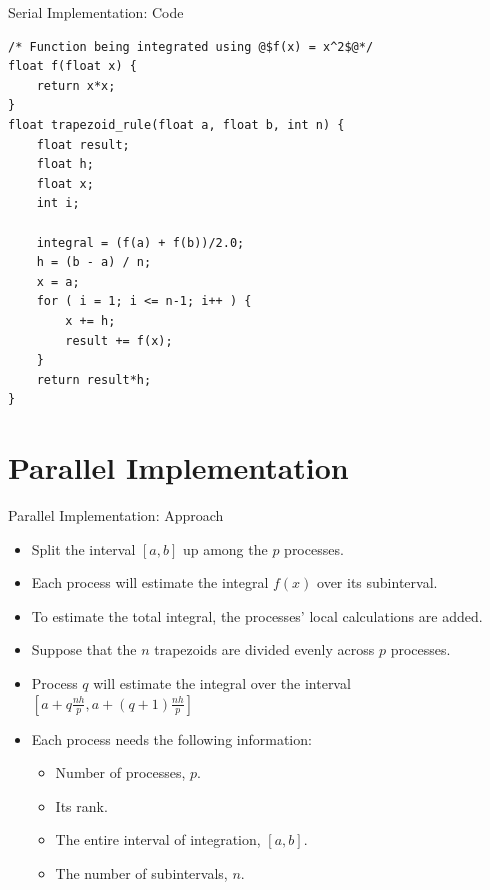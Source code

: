 \documentclass[t]{beamer}
\begin{document}
\begin{frame}[containsverbatim]{Serial Implementation: Code}
\begin{verbatim}
/* Function being integrated using @$f(x) = x^2$@*/
float f(float x) {
	return x*x;
}
float trapezoid_rule(float a, float b, int n) {
	float result;
	float h;
	float x;
	int i;

	integral = (f(a) + f(b))/2.0;
	h = (b - a) / n;
	x = a;
	for ( i = 1; i <= n-1; i++ ) {
		x += h;
		result += f(x);
	}
	return result*h;
}
\end{verbatim}
\end{frame}

\section{Parallel Implementation}
\begin{frame}{Parallel Implementation: Approach}
	\begin{itemize}
		\item Split the interval $[a,b]$ up among the $p$ processes.
		\item Each process will estimate the integral $f(x)$ over its subinterval.
		\item To estimate the total integral, the processes’ local calculations are added.
		\item Suppose that the $n$ trapezoids are divided evenly across $p$ processes.
		\item Process $q$ will estimate the integral over the interval \\
		$[a + q\frac{nh}{p}, a + (q + 1)\frac{nh}{p}]$
		
		\item Each process needs the following information:
		\begin{itemize}
			\item Number of processes, $p$.
			\item Its rank.
			\item The entire interval of integration, $[a, b]$.
			\item The number of subintervals, $n$.
		\end{itemize}
	\end{itemize}
\end{frame}
\end{document}
